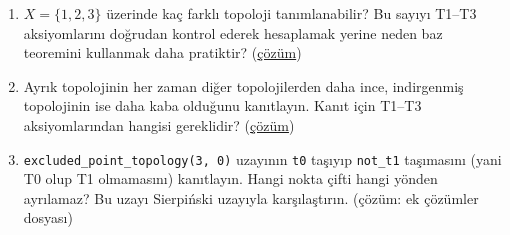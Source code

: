 \begin{enumerate}[label=\textbf{T\arabic*.}]
  \item \label{ex:ch04:T1} $X=\{1,2,3\}$ üzerinde kaç farklı topoloji
        tanımlanabilir? Bu sayıyı T1--T3 aksiyomlarını doğrudan kontrol
        ederek hesaplamak yerine neden baz teoremini kullanmak daha
        pratiktir?
        (\hyperref[sol:ch04:T1]{çözüm})

  \item \label{ex:ch04:T2} Ayrık topolojinin her zaman diğer
        topolojilerden daha ince, indirgenmiş topolojinin ise daha kaba
        olduğunu kanıtlayın. Kanıt için T1--T3 aksiyomlarından hangisi
        gereklidir?
        (\hyperref[sol:ch04:T2]{çözüm})

  \item \label{ex:ch04:T3} \texttt{excluded\_point\_topology(3, 0)}
        uzayının \texttt{t0} taşıyıp \texttt{not\_t1} taşımasını (yani
        T0 olup T1 olmamasını) kanıtlayın. Hangi nokta çifti hangi
        yönden ayrılamaz? Bu uzayı Sierpiński uzayıyla karşılaştırın.
        (çözüm: ek çözümler dosyası)
\end{enumerate}
